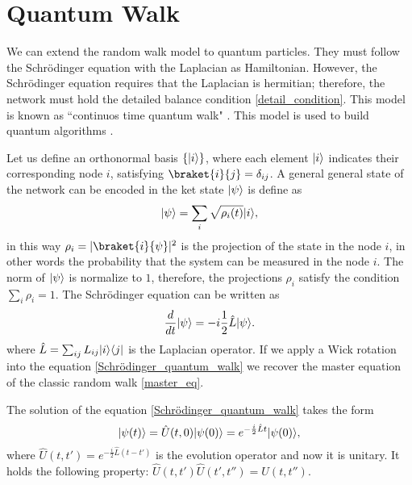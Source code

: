 \section{Quantum Walk}
We can extend the random walk model to quantum particles. 
They must follow the Schrödinger equation with the Laplacian as Hamiltonian. However, the Schrödinger equation requires that the Laplacian is hermitian; therefore, the network must hold the detailed balance condition \eqref{detail_condition}.
This model is known as “continuos time quantum walk" \cite{Farhi_98, quantum_walk}. This model is used to build quantum algorithms \cite{Quantum_walk_Google, classic_to_quantum_networks}.

Let us define an orthonormal basis $\{\lvert i\rangle\}$, where each element $\lvert i\rangle$ indicates their corresponding node $i$, satisfying $\braket{i}{j}=\delta_{ij}$. 
A general general state of the network can be encoded in the ket state $\lvert\psi\rangle$ is define as
\begin{equation}\label{ket_state_quantum}
    \lvert\psi\rangle = \sum_i \sqrt{\rho_i(t)} \lvert i\rangle,
\end{equation}
in this way $\rho_i = |\braket{i}{\psi}|^2$ is the projection of the state in the node $i$, in other words the probability that the system can be measured in the node $i$. The norm of $\lvert\psi\rangle$ is normalize to $1$, therefore, the projections $\rho_i$ satisfy the condition $\sum_i \rho_i = 1$.
The Schrödinger equation can be written as
\begin{equation}\label{Schrödinger_quantum_walk}
    \frac{d}{dt}\lvert\psi\rangle = -i\frac{1}{2}\hat L\lvert\psi\rangle.
\end{equation}
where $\hat L = \sum_{ij} L_{ij}\lvert i\rangle\langle j\rvert$ is the Laplacian operator.
If we apply a Wick rotation into the equation \eqref{Schrödinger_quantum_walk} we recover the master equation of the classic random walk \eqref{master_eq}.

The solution of the equation \eqref{Schrödinger_quantum_walk} takes the form
\begin{equation}
    \lvert\psi(t)\rangle = \hat U(t,0) \lvert\psi(0)\rangle = e^{-\frac{i}{2}\hat L t} \lvert\psi(0)\rangle,
\end{equation}
where $\hat U(t,t') =e^{-\frac{i}{2}\hat L (t-t')}$ is the evolution operator and now it is unitary. It holds the following property: $\hat U(t,t')\hat U(t',t'') = U(t,t'')$.

